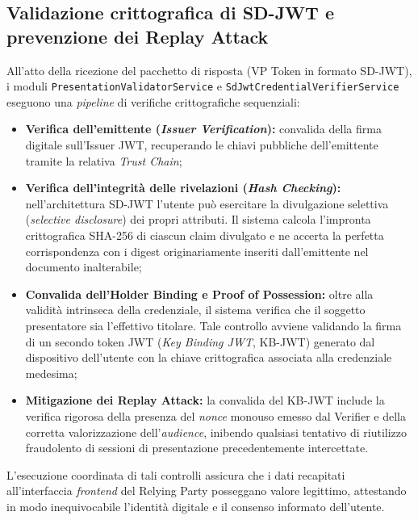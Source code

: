 \subsection{Validazione crittografica di SD-JWT e prevenzione dei Replay Attack}
All'atto della ricezione del pacchetto di risposta (VP Token in formato SD-JWT), i moduli \texttt{PresentationValidatorService} e \texttt{SdJwtCredentialVerifierService} eseguono una \textit{pipeline} di verifiche crittografiche sequenziali:
\begin{itemize}
    \item \textbf{Verifica dell'emittente (\textit{Issuer Verification}):} convalida della firma digitale sull'Issuer JWT, recuperando le chiavi pubbliche dell'emittente tramite la relativa \textit{Trust Chain};
    \item \textbf{Verifica dell'integrità delle rivelazioni (\textit{Hash Checking}):} nell'architettura SD-JWT l'utente può esercitare la divulgazione selettiva (\textit{selective disclosure}) dei propri attributi. Il sistema calcola l'impronta crittografica SHA-256 di ciascun claim divulgato e ne accerta la perfetta corrispondenza con i digest originariamente inseriti dall'emittente nel documento inalterabile;
    \item \textbf{Convalida dell'Holder Binding e Proof of Possession:} oltre alla validità intrinseca della credenziale, il sistema verifica che il soggetto presentatore sia l'effettivo titolare. Tale controllo avviene validando la firma di un secondo token JWT (\textit{Key Binding JWT}, KB-JWT) generato dal dispositivo dell'utente con la chiave crittografica associata alla credenziale medesima;
    \item \textbf{Mitigazione dei Replay Attack:} la convalida del KB-JWT include la verifica rigorosa della presenza del \textit{nonce} monouso emesso dal Verifier e della corretta valorizzazione dell'\textit{audience}, inibendo qualsiasi tentativo di riutilizzo fraudolento di sessioni di presentazione precedentemente intercettate.
\end{itemize}
L'esecuzione coordinata di tali controlli assicura che i dati recapitati all'interfaccia \textit{frontend} del Relying Party posseggano valore legittimo, attestando in modo inequivocabile l'identità digitale e il consenso informato dell'utente.